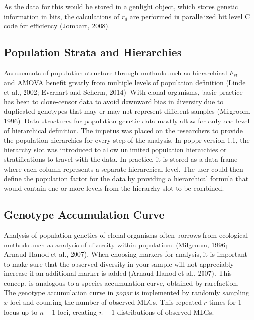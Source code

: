 \documentclass{frontiersSCNS} %
\begin{document}
As the data for this would be stored in a genlight object, which stores
genetic information in bits, the calculations of \(\bar{r}_d\) are
performed in parallelized bit level C code for efficiency (Jombart,
2008).

\subsection*{Population Strata and
Hierarchies}\label{population-strata-and-hierarchies}

Assessments of population structure through methods such as hierarchical
\(F_{st}\) and AMOVA benefit greatly from multiple levels of population
definition (Linde et al., 2002; Everhart and Scherm, 2014). With clonal
organisms, basic practice has been to clone-censor data to avoid
downward bias in diversity due to duplicated genotypes that may or may
not represent different samples (Milgroom, 1996). Data structures for
population genetic data mostly allow for only one level of hierarchical
definition. The impetus was placed on the researchers to provide the
population hierarchies for every step of the analysis. In poppr version
1.1, the hierarchy slot was introduced to allow unlimited population
hierarchies or stratifications to travel with the data. In practice, it
is stored as a data frame where each column represents a separate
hierarchical level. The user could then define the population factor for
the data by providing a hierarchical formula that would contain one or
more levels from the hierarchy slot to be combined.

\subsection*{Genotype Accumulation
Curve}\label{genotype-accumulation-curve}

Analysis of population genetics of clonal organisms often borrows from
ecological methods such as analysis of diversity within populations
(Milgroom, 1996; Arnaud-Hanod et al., 2007). When choosing markers for
analysis, it is important to make sure that the observed diversity in
your sample will not appreciably increase if an additional marker is
added (Arnaud-Hanod et al., 2007). This concept is analogous to a
species accumulation curve, obtained by rarefaction. The genotype
accumulation curve in \emph{poppr} is implemented by randomly sampling
\(x\) loci and counting the number of observed MLGs. This repeated \(r\)
times for 1 locus up to \(n-1\) loci, creating \(n-1\) distributions of
observed MLGs.
\end{document}
